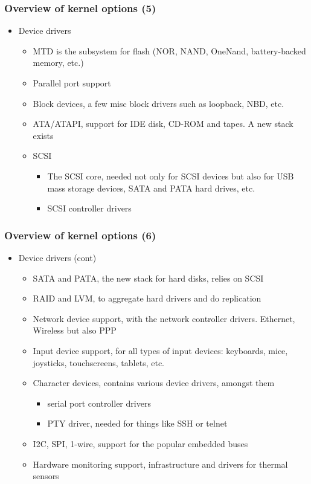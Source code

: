\begin{frame}
  \frametitle{Overview of kernel options (5)}
  \begin{itemize}
  \item Device drivers
    \begin{itemize}
    \item MTD is the subsystem for flash (NOR, NAND, OneNand,
      battery-backed memory, etc.)
    \item Parallel port support
    \item Block devices, a few misc block drivers such as loopback,
      NBD, etc.
    \item ATA/ATAPI, support for IDE disk, CD-ROM and tapes. A new
      stack exists
    \item SCSI
      \begin{itemize}
      \item The SCSI core, needed not only for SCSI devices but also
        for USB mass storage devices, SATA and PATA hard drives, etc.
      \item SCSI controller drivers
      \end{itemize}
    \end{itemize}
  \end{itemize}
\end{frame}

\begin{frame}
  \frametitle{Overview of kernel options (6)}
  \begin{itemize}
  \item Device drivers (cont)
    \begin{itemize}
    \item SATA and PATA, the new stack for hard disks, relies on SCSI
    \item RAID and LVM, to aggregate hard drivers and do replication
    \item Network device support, with the network controller
      drivers. Ethernet, Wireless but also PPP
    \item Input device support, for all types of input devices:
      keyboards, mice, joysticks, touchscreens, tablets, etc.
    \item Character devices, contains various device drivers, amongst
      them
      \begin{itemize}
      \item serial port controller drivers
      \item PTY driver, needed for things like SSH or telnet
      \end{itemize}
    \item I2C, SPI, 1-wire, support for the popular embedded buses
    \item Hardware monitoring support, infrastructure and drivers for
      thermal sensors
    \end{itemize}
  \end{itemize}
\end{frame}

